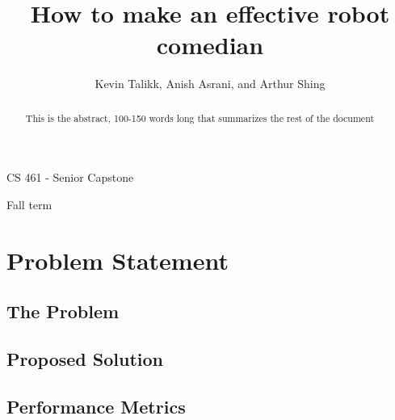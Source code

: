 \documentclass[journal, letterpaper, draftclsnofoot, onecolumn, 10pt]{IEEEtran}
\begin{document}
\title{How to make an effective robot comedian}
\author{Kevin Talikk, Anish Asrani, and Arthur Shing}

\begin{titlepage}
    \centering
    \maketitle
    CS 461 - Senior Capstone\par
    Fall term\par
    \vspace{1cm}
    \begin{abstract}
      This is the abstract, 100-150 words long that summarizes the rest of the document
    \end{abstract}


\end{titlepage}

\section{Problem Statement}

\subsection{The Problem}



\subsection{Proposed Solution}



\subsection{Performance Metrics}




\FloatBarrier
\end{document}
